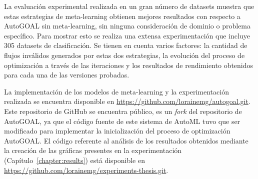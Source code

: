 \begin{conclusions}
La evaluación experimental realizada en un gran número de datasets muestra que estas estrategias de meta-learning obtienen mejores resultados con respecto a AutoGOAL sin meta-learning, sin ninguna consideración de dominio o problema específico. Para mostrar esto se realiza una extensa experimentación que incluye 305 datasets de clasificación. Se tienen en cuenta varios factores: la cantidad de flujos inválidos generados por estas dos estrategias, la evolución del proceso de optimización a través de las iteraciones y los resultados de rendimiento obtenidos para cada una de las versiones probadas.

La implementación de los modelos de meta-learning y la experimentación realizada se encuentra disponible en \url{https://github.com/lorainemg/autogoal.git}. Este repositorio de GitHub se encuentra público, es un \textit{fork} del repositorio de AutoGOAL, ya que el código fuente de este sistema de AutoML tuvo que ser modificado para implementar la inicialización del proceso de optimización AutoGOAL. El código referente al análisis de los resultados obtenidos mediante la creación de las gráficas presentes en la experimentación (Capítulo~\ref{chapter:results}) está disponible en \url{https://github.com/lorainemg/experiments-thesis.git}.

\end{conclusions}
